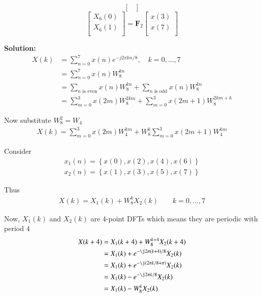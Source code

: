 \documentclass[journal,12pt,twocolumn]{IEEEtran}
\newcommand{\solution}{\noindent \textbf{Solution: }}
\providecommand{\cbrak}[1]{\ensuremath{\left\{#1\right\}}}
\let\vec\mathbf
\numberwithin{equation}{section}
\renewcommand\thesection{\arabic{section}}
\renewcommand\thesection{\arabic{section}}
\begin{document}
\begin{enumerate}[label=\arabic*.,ref=\thesection.\theenumi]
\begin{equation}
\begin{bmatrix}
\end{bmatrix}
\end{equation}
\begin{equation}
\begin{bmatrix}
X_{6}(0) \\ 
X_{6}(1)\\ 
\end{bmatrix}
= \vec{F}_{2}
\begin{bmatrix}
x(3) \\ 
x(7) \\ 
\end{bmatrix}
\end{equation}

	\solution 
	\begin{align}
        X(k) &= \sum_{n=0}^7 x(n) e^{-j 2 \pi k n / 8}, \quad k=0, \ldots, 7\\
        &= \sum_{n=0}^7 x(n) W_8^{kn} \\
        &= \sum_{n \text{ is even}}x(n) W_8^{kn} + \sum_{n \text{ is odd}}x(n) W_8^{kn} \\
        &= \sum_{m=0}^3 x(2m) W_8^{2km} + \sum_{m=0}^3 x(2m+1) W_8^{2km + k}
    \end{align}	
    
    Now substitute $W_8^2 = W_4$
    \begin{align}
    		X(k) = \sum_{m=0}^3 x(2m) W_4^{km} + W_8^k \sum_{m=0}^3 x(2m+1) W_4^{km}
    \end{align}
    
    Consider
    \begin{align}
    		x_1(n) = \cbrak{x(0), x(2), x(4), x(6)} \\
    		x_2(n) = \cbrak{x(1), x(3), x(5), x(7)}
    \end{align}
    
    Thus
    \begin{align}
    		X(k) = X_1(k) + W_8^k X_2(k) \qquad k = 0,\ldots,7
    \end{align}
    
    Now, $X_1(k)$ and $X_2(k)$ are $4$-point DFTs which means they are periodic with period $4$
    \begin{align}
    		X(k+4) &= X_1(k+4) + W_8^{k+4} X_2(k+4) \\
    		&= X_1(k) + e^{-\j 2\pi(k+4)/8} X_2(k) \\
    		&= X_1(k) + e^{-\j (2\pi k/8 + \pi)} X_2(k) \\
    		&= X_1(k) - e^{-\j 2\pi k/8 } X_2(k) \\
    		&= X_1(k) - W_8^k X_2(k)
    \end{align}
    

\end{enumerate}
\end{document}
